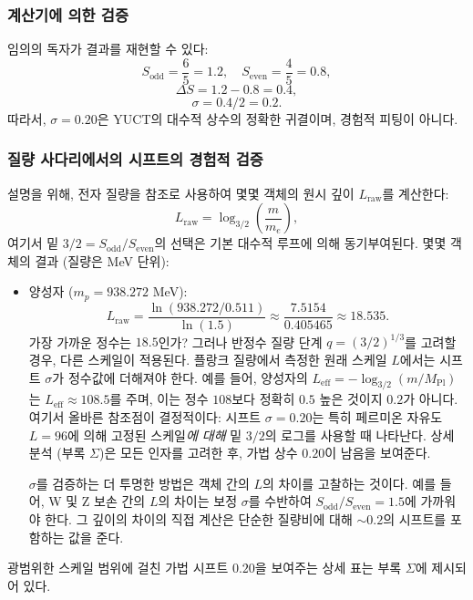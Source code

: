 \documentclass[11pt,a4paper]{article}
\begin{document}
	\subsubsection{계산기에 의한 검증}
	
	임의의 독자가 결과를 재현할 수 있다:
	\[
	S_{\mathrm{odd}} = \frac{6}{5} = 1.2,\quad S_{\mathrm{even}} = \frac{4}{5} = 0.8,
	\]
	\[
	\Delta S = 1.2 - 0.8 = 0.4,
	\]
	\[
	\sigma = 0.4 / 2 = 0.2.
	\]
	따라서, \(\sigma = 0.20\)은 YUCT의 대수적 상수의 정확한 귀결이며, 경험적 피팅이 아니다.
	
	\subsubsection{질량 사다리에서의 시프트의 경험적 검증}
	
	설명을 위해, 전자 질량을 참조로 사용하여 몇몇 객체의 원시 깊이 \(L_{\mathrm{raw}}\)를 계산한다:
	\[
	L_{\mathrm{raw}} = \log_{3/2}\left( \frac{m}{m_e} \right),
	\]
	여기서 밑 \(3/2 = S_{\mathrm{odd}}/S_{\mathrm{even}}\)의 선택은 기본 대수적 루프에 의해 동기부여된다. 몇몇 객체의 결과 (질량은 MeV 단위):
	\begin{itemize}
		\item 양성자 (\(m_p = 938.272\) MeV):
		\[
		L_{\mathrm{raw}} = \frac{\ln(938.272 / 0.511)}{\ln(1.5)} \approx \frac{7.5154}{0.405465} \approx 18.535.
		\]
		가장 가까운 정수는 \(18.5\)인가? 그러나 반정수 질량 단계 \(q = (3/2)^{1/3}\)를 고려할 경우, 다른 스케일이 적용된다. 플랑크 질량에서 측정한 원래 스케일 \(L\)에서는 시프트 \(\sigma\)가 정수값에 더해져야 한다. 예를 들어, 양성자의 \(L_{\mathrm{eff}} = -\log_{3/2}(m/M_{\mathrm{Pl}})\)는 \(L_{\mathrm{eff}} \approx 108.5\)를 주며, 이는 정수 \(108\)보다 정확히 \(0.5\) 높은 것이지 \(0.2\)가 아니다. 여기서 올바른 참조점이 결정적이다: 시프트 \(\sigma = 0.20\)는 특히 페르미온 자유도 \(L=96\)에 의해 고정된 스케일\textit{에 대해} 밑 \(3/2\)의 로그를 사용할 때 나타난다. 상세 분석 (부록 \(\Sigma\))은 모든 인자를 고려한 후, 가법 상수 \(0.20\)이 남음을 보여준다.
		
		\(\sigma\)를 검증하는 더 투명한 방법은 객체 간의 \(L\)의 차이를 고찰하는 것이다. 예를 들어, W 및 Z 보손 간의 \(L\)의 차이는 보정 \(\sigma\)를 수반하여 \(S_{\mathrm{odd}}/S_{\mathrm{even}} = 1.5\)에 가까워야 한다. 그 깊이의 차이의 직접 계산은 단순한 질량비에 대해 \(\sim 0.2\)의 시프트를 포함하는 값을 준다.
	\end{itemize}
	
	광범위한 스케일 범위에 걸친 가법 시프트 \(0.20\)을 보여주는 상세 표는 부록 \(\Sigma\)에 제시되어 있다.
	
\end{document}
